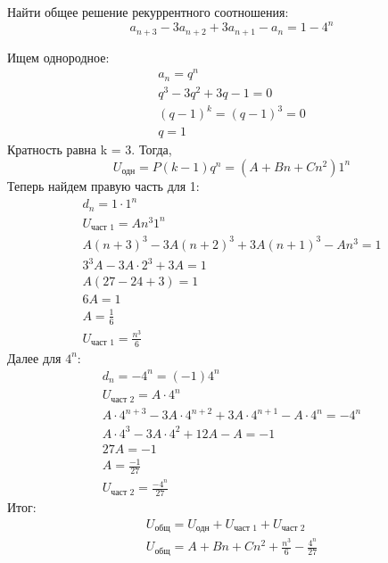 \begin{task}
    Найти общее решение рекуррентного соотношения:
    \begin{equation*}
        a_{n+3} - 3a_{n+2} + 3a_{n+1} - a_n = 1 - 4^n
    \end{equation*}
    \begin{solution}
        Ищем однородное:
        \begin{gather*}
            a_n = q^n \\
            q^3 - 3q^2 + 3q - 1 = 0 \\
            (q - 1)^k = (q - 1)^3 = 0 \\
            q = 1
        \end{gather*}
        Кратность равна k = 3.
        Тогда,
        \begin{equation*}
            U_{\text{одн}} = P(k-1)q^n = (A + Bn + Cn^2)1^n
        \end{equation*}
        Теперь найдем правую часть для 1:
        \begin{gather*}
            d_n = 1 \cdot 1^n \\
            U_{\text{част 1}} = A n^3 1^n \\
            A(n+3)^3 - 3A(n+2)^3 + 3A(n+1)^3 - An^3 = 1 \\
            3^3A - 3A \cdot 2^3 + 3A = 1 \\
            A(27 - 24 + 3) = 1 \\
            6A = 1 \\
            A = \frac{1}{6} \\
            U_{\text{част 1}} = \frac{n^3}{6}
        \end{gather*}
        Далее для $4^n$:
        \begin{gather*}
            d_n = -4^n = (-1) 4^n \\
            U_{\text{част 2}} = A \cdot 4^n \\
            A \cdot 4^{n+3} - 3A \cdot 4^{n+2} + 3A \cdot 4^{n+1} - A \cdot 4^n = -4^n \\
            A \cdot 4^3 - 3A \cdot 4^2 + 12 A - A = -1 \\
            27A = -1 \\
            A = \frac{-1}{27} \\
            U_{\text{част 2}} = \frac{-4^n}{27}
        \end{gather*}
        Итог:
        \begin{gather*}
            U_{\text{общ}} = U_{\text{одн}} + U_{\text{част 1}} + U_{\text{част 2}} \\
            U_{\text{общ}} = A + Bn + Cn^2 + \frac{n^3}{6} - \frac{4^n}{27}
        \end{gather*}
    \end{solution}
\end{task}


